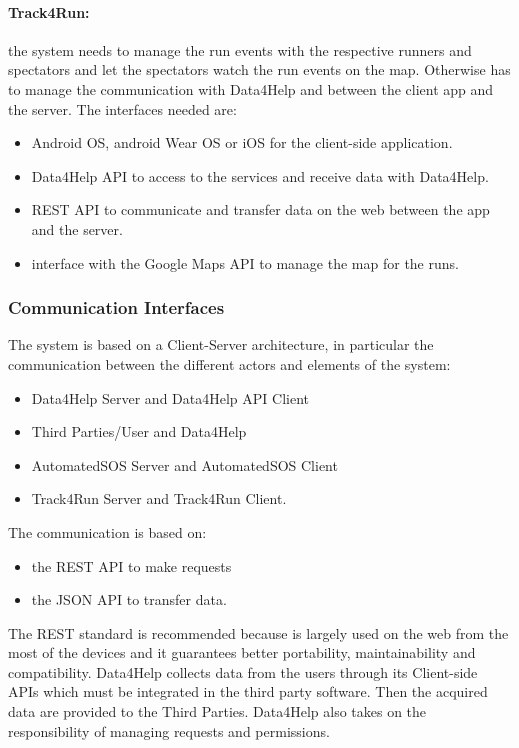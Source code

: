 \documentclass[a4paper]{article}
\begin{document}
\paragraph{Track4Run:} the system needs to manage the run events with the respective runners and spectators and let the spectators watch the run events on the map. Otherwise has to manage the communication with Data4Help and between the client app and the server. The interfaces needed are:

\begin{itemize}
    \item Android OS, android Wear OS or iOS for the client-side application.
    \item Data4Help API to access to the services and receive data with Data4Help.
    \item REST API to communicate and transfer data on the web between the app and the server.
    \item interface with the Google Maps API to manage the map for the runs.
\end{itemize}
\clearpage

\subsubsection{Communication Interfaces}

The system is based on a Client-Server architecture, in particular the communication between the different actors and elements of the system:
\begin{itemize}
    \item Data4Help Server and Data4Help API Client
    \item Third Parties/User and Data4Help
    \item AutomatedSOS Server and AutomatedSOS Client
    \item Track4Run Server and Track4Run Client.
\end{itemize}

The communication is based on: 
\begin{itemize}
    \item the REST API to make requests
    \item the JSON API to transfer data.
\end{itemize}

The REST standard is recommended because is largely used on the web from the most of the devices and it guarantees better portability, maintainability and compatibility. \newline
Data4Help collects data from the users through its Client-side APIs which must be integrated in the third party software. Then the acquired data are provided to the Third Parties. Data4Help also takes on the responsibility of managing requests and permissions. \clearpage
\end{document}
